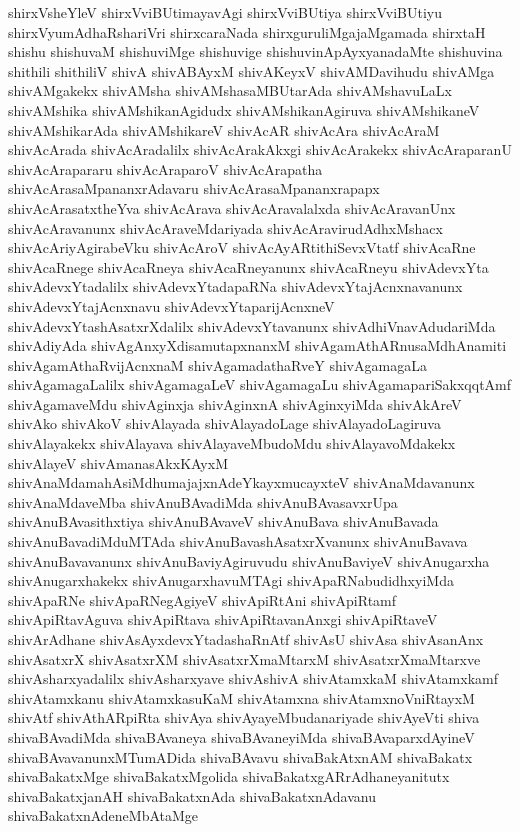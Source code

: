 {shirxVsheYleV
shirxVviBUtimayavAgi
shirxVviBUtiya
shirxVviBUtiyu
shirxVyumAdhaRshariVri
shirxcaraNada
shirxguruliMgajaMgamada
shirxtaH
shishu
shishuvaM
shishuviMge
shishuvige
shishuvinApAyxyanadaMte
shishuvina
shithili
shithiliV
shivA
shivABAyxM
shivAKeyxV
shivAMDavihudu
shivAMga
shivAMgakekx
shivAMsha
shivAMshasaMBUtarAda
shivAMshavuLaLx
shivAMshika
shivAMshikanAgidudx
shivAMshikanAgiruva
shivAMshikaneV
shivAMshikarAda
shivAMshikareV
shivAcAR
shivAcAra
shivAcAraM
shivAcArada
shivAcAradalilx
shivAcArakAkxgi
shivAcArakekx
shivAcAraparanU
shivAcArapararu
shivAcAraparoV
shivAcArapatha
shivAcArasaMpananxrAdavaru
shivAcArasaMpananxrapapx
shivAcArasatxtheYva
shivAcArava
shivAcAravalalxda
shivAcAravanUnx
shivAcAravanunx
shivAcAraveMdariyada
shivAcAravirudAdhxMshacx
shivAcAriyAgirabeVku
shivAcAroV
shivAcAyARtithiSevxVtatf
shivAcaRne
shivAcaRnege
shivAcaRneya
shivAcaRneyanunx
shivAcaRneyu
shivAdevxYta
shivAdevxYtadalilx
shivAdevxYtadapaRNa
shivAdevxYtajAcnxnavanunx
shivAdevxYtajAcnxnavu
shivAdevxYtaparijAcnxneV
shivAdevxYtashAsatxrXdalilx
shivAdevxYtavanunx
shivAdhiVnavAdudariMda
shivAdiyAda
shivAgAnxyXdisamutapxnanxM
shivAgamAthARnusaMdhAnamiti
shivAgamAthaRvijAcnxnaM
shivAgamadathaRveY
shivAgamagaLa
shivAgamagaLalilx
shivAgamagaLeV
shivAgamagaLu
shivAgamapariSakxqqtAmf
shivAgamaveMdu
shivAginxja
shivAginxnA
shivAginxyiMda
shivAkAreV
shivAko
shivAkoV
shivAlayada
shivAlayadoLage
shivAlayadoLagiruva
shivAlayakekx
shivAlayava
shivAlayaveMbudoMdu
shivAlayavoMdakekx
shivAlayeV
shivAmanasAkxKAyxM
shivAnaMdamahAsiMdhumajajxnAdeYkayxmucayxteV
shivAnaMdavanunx
shivAnaMdaveMba
shivAnuBAvadiMda
shivAnuBAvasavxrUpa
shivAnuBAvasithxtiya
shivAnuBAvaveV
shivAnuBava
shivAnuBavada
shivAnuBavadiMduMTAda
shivAnuBavashAsatxrXvanunx
shivAnuBavava
shivAnuBavavanunx
shivAnuBaviyAgiruvudu
shivAnuBaviyeV
shivAnugarxha
shivAnugarxhakekx
shivAnugarxhavuMTAgi
shivApaRNabudidhxyiMda
shivApaRNe
shivApaRNegAgiyeV
shivApiRtAni
shivApiRtamf
shivApiRtavAguva
shivApiRtava
shivApiRtavanAnxgi
shivApiRtaveV
shivArAdhane
shivAsAyxdevxYtadashaRnAtf
shivAsU
shivAsa
shivAsanAnx
shivAsatxrX
shivAsatxrXM
shivAsatxrXmaMtarxM
shivAsatxrXmaMtarxve
shivAsharxyadalilx
shivAsharxyave
shivAshivA
shivAtamxkaM
shivAtamxkamf
shivAtamxkanu
shivAtamxkasuKaM
shivAtamxna
shivAtamxnoVniRtayxM
shivAtf
shivAthARpiRta
shivAya
shivAyayeMbudanariyade
shivAyeVti
shiva
shivaBAvadiMda
shivaBAvaneya
shivaBAvaneyiMda
shivaBAvaparxdAyineV
shivaBAvavanunxMTumADida
shivaBAvavu
shivaBakAtxnAM
shivaBakatx
shivaBakatxMge
shivaBakatxMgolida
shivaBakatxgARrAdhaneyanitutx
shivaBakatxjanAH
shivaBakatxnAda
shivaBakatxnAdavanu
shivaBakatxnAdeneMbAtaMge
}

